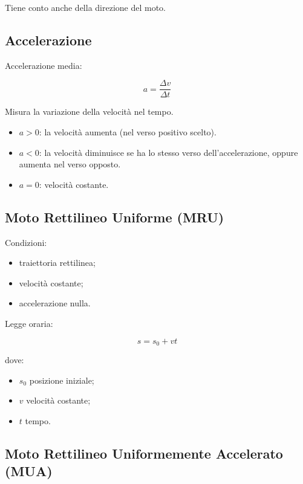 \noindent Tiene conto anche della direzione del moto.

\vspace{0.3cm}

\subsection{Accelerazione}

Accelerazione media:

\[
a=\frac{\Delta v}{\Delta t}
\]

\noindent Misura la variazione della velocità nel tempo.

\begin{itemize}
\item $a>0$: la velocità aumenta (nel verso positivo scelto).
\item $a<0$: la velocità diminuisce se ha lo stesso verso dell'accelerazione, oppure aumenta nel verso opposto.
\item $a=0$: velocità costante.
\end{itemize}

\vspace{0.3cm}

\subsection{Moto Rettilineo Uniforme (MRU)}

Condizioni:

\begin{itemize}
\item traiettoria rettilinea;
\item velocità costante;
\item accelerazione nulla.
\end{itemize}

\noindent Legge oraria:

\[
s=s_0+vt
\]

\noindent dove:

\begin{itemize}
\item $s_0$ posizione iniziale;
\item $v$ velocità costante;
\item $t$ tempo.
\end{itemize}

\vspace{0.3cm}

\subsection{Moto Rettilineo Uniformemente Accelerato (MUA)}

